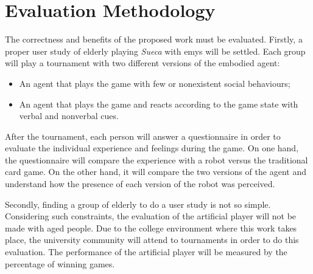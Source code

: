 \section{Evaluation Methodology} \label{sec:evaluation}

The correctness and benefits of the proposed work must be evaluated.
Firstly, a proper user study of elderly playing \emph{Sueca} with \gls{emys} will be settled.
Each group will play a tournament with two different versions of the embodied agent:
\begin{itemize}
\item An agent that plays the game with few or nonexistent social behaviours;
\item An agent that plays the game and reacts according to the game state with verbal and nonverbal cues.
\end{itemize}
After the tournament, each person will answer a questionnaire in order to evaluate the individual experience and feelings during the game.
On one hand, the questionnaire will compare the experience with a robot versus the traditional card game.
On the other hand, it will compare the two versions of the agent and understand how the presence of each version of the robot was perceived.

Secondly, finding a group of elderly to do a user study is not so simple.
Considering such constraints, the evaluation of the artificial player will not be made with aged people.
Due to the college environment where this work takes place, the university community will attend to tournaments in order to do this evaluation.
The performance of the artificial player will be measured by the percentage of winning games.
